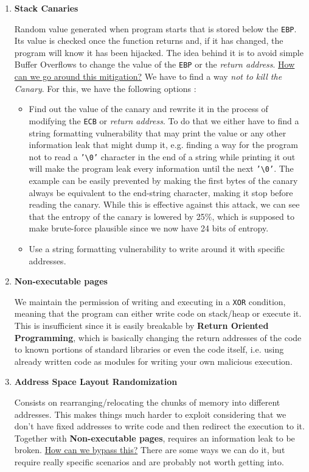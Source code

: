 \documentclass[11pt]{article}
\begin{document}
\begin{enumerate}
\item \textbf{Stack Canaries}
\label{sec:org1f17b47}

Random value generated when program starts that is stored below the \texttt{EBP}. Its value is checked once the function returns and, if it has changed, the program will know it has been hijacked. The idea behind it is to avoid simple Buffer Overflows to change the value of the \texttt{EBP} or the \emph{return address}. \uline{How can we go around this mitigation?} We have to find a way \emph{not to kill the Canary}. For this, we have the following options :
\begin{itemize}
\item Find out the value of the canary and rewrite it in the process of modifying the \texttt{ECB} or \emph{return address}. To do that we either have to find a string formatting vulnerability that may print the value or any other information leak that might dump it, e.g. finding a way for the program not to read a \texttt{'\textbackslash{}0'} character in the end of a string while printing it out will make the program leak every information until the next \texttt{'\textbackslash{}0'}. The example can be easily prevented by making the first bytes of the canary always be equivalent to the end-string character, making it stop before reading the canary. While this is effective against this attack, we can see that the entropy of the canary is lowered by 25\%, which is supposed to make brute-force plausible since we now have 24 bits of entropy.
\item Use a string formatting vulnerability to write around it with specific addresses.
\end{itemize}

\item \textbf{Non-executable pages}
\label{sec:orgc6fc2ee}

We maintain the permission of writing and executing in a \texttt{XOR} condition, meaning that the program can either write code on stack/heap or execute it. This is insufficient since it is easily breakable by \textbf{Return Oriented Programming}, which is basically changing the return addresses of the code to known portions of standard libraries or even the code itself, i.e. using already written code as modules for writing your own malicious execution.

\item \textbf{Address Space Layout Randomization}
\label{sec:org5a13c15}

Consists on rearranging/relocating the chunks of memory into different addresses. This makes things much harder to exploit considering that we don't have fixed addresses to write code and then redirect the execution to it. Together with \textbf{Non-executable pages}, requires an information leak to be broken. \uline{How can we bypass this?} There are some ways we can do it, but require really specific scenarios \cite{muller_aslr_nodate} and are probably not worth getting into.
\end{enumerate}
\end{document}
